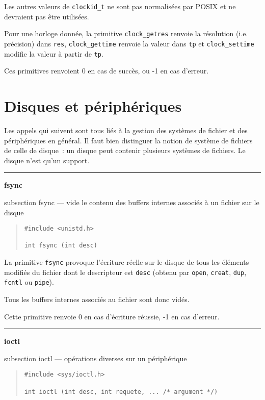 \documentclass [twoside] {report}
\newcommand {\primitive} [1]
    {
	\phantomsection
	{\large \textbf {#1}}
	\addcontentsline {toc} {subsection} {#1}
    }
\newcommand {\separation}
    {
	\vspace {5mm}
	\nopagebreak
	\hrule
    }
\begin{document}
Les autres valeurs de \verb|clockid_t| ne sont pas normalisées par POSIX
et ne devraient pas être utilisées.

Pour une horloge donnée, la primitive \texttt {clock\_getres} renvoie la
résolution (i.e. précision) dans \texttt {res}, \texttt {clock\_gettime}
renvoie la valeur dans \texttt {tp} et \texttt {clock\_settime} modifie
la valeur à partir de \texttt {tp}.

Ces primitives renvoient 0 en cas de succès, ou -1 en cas d'erreur.



\section {Disques et périphériques}


Les appels qui suivent sont tous liés à la
gestion des systèmes de fichier et des périphériques en
général. Il faut bien distinguer la notion de
système de fichiers de celle de disque~: un disque
peut contenir plusieurs systèmes de fichiers. Le
disque n'est qu'un support.




\separation
\primitive {fsync} --- vide le contenu des buffers internes associés à un fichier sur le disque

\begin {quote}
\begin {verbatim}
#include <unistd.h>

int fsync (int desc)
\end{verbatim}
\end {quote}

La primitive \texttt {fsync} provoque l'écriture réelle
sur le disque de tous les éléments modifiés du fichier dont le
descripteur est \texttt {desc} (obtenu par \texttt {open},
\texttt {creat}, \texttt {dup}, \texttt {fcntl} ou \texttt {pipe}).

Tous les buffers internes associés au fichier
sont donc vidés.

Cette primitive renvoie 0 en cas d'écriture
réussie, -1 en cas d'erreur.




\separation
\primitive {ioctl} --- opérations diverses sur un périphérique

\begin {quote}
\begin {verbatim}
#include <sys/ioctl.h>

int ioctl (int desc, int requete, ... /* argument */)
\end{verbatim}
\end {quote}
\end{document}

